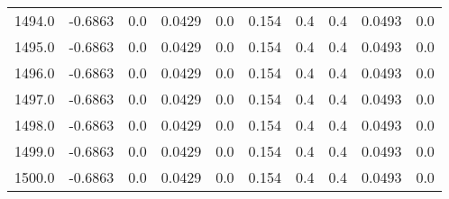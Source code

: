 \begin{longtable}{lrrrrrrrrr}
1494.0 & -0.6863 & 0.0 & 0.0429 & 0.0 & 0.154 & 0.4 & 0.4 & 0.0493 & 0.0 \\
1495.0 & -0.6863 & 0.0 & 0.0429 & 0.0 & 0.154 & 0.4 & 0.4 & 0.0493 & 0.0 \\
1496.0 & -0.6863 & 0.0 & 0.0429 & 0.0 & 0.154 & 0.4 & 0.4 & 0.0493 & 0.0 \\
1497.0 & -0.6863 & 0.0 & 0.0429 & 0.0 & 0.154 & 0.4 & 0.4 & 0.0493 & 0.0 \\
1498.0 & -0.6863 & 0.0 & 0.0429 & 0.0 & 0.154 & 0.4 & 0.4 & 0.0493 & 0.0 \\
1499.0 & -0.6863 & 0.0 & 0.0429 & 0.0 & 0.154 & 0.4 & 0.4 & 0.0493 & 0.0 \\
1500.0 & -0.6863 & 0.0 & 0.0429 & 0.0 & 0.154 & 0.4 & 0.4 & 0.0493 & 0.0 \\
\end{longtable}